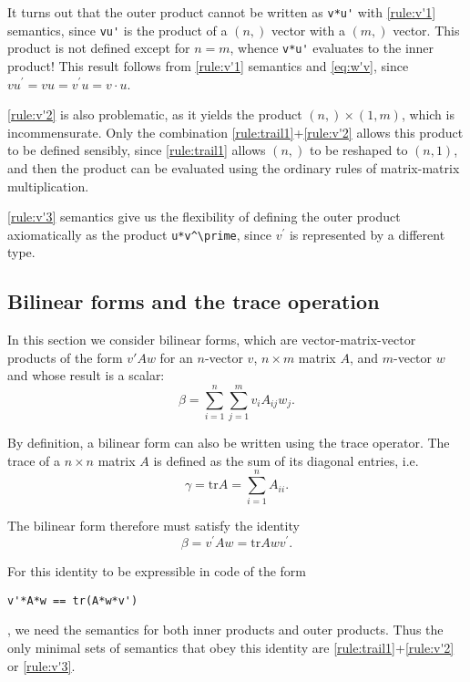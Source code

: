 It turns out that the outer product cannot be written as \lstinline|v*u'| with
\ref{rule:v'1} semantics, since \lstinline|vu'| is the product of a $(n,)$
vector with a $(m,)$ vector. This product is not defined except for $n = m$,
whence \lstinline|v*u'| evaluates to the inner product! This result follows
from \ref{rule:v'1} semantics and \eqref{eq:w'v}, since $vu^\prime = vu =
v^\prime u = v \cdot u$.

\ref{rule:v'2} is also problematic, as it yields the product $(n,) \times (1,
m)$, which is incommensurate. Only the combination
\ref{rule:trail1}+\ref{rule:v'2} allows this product to be defined sensibly,
since \ref{rule:trail1} allows $(n,)$ to be reshaped to $(n,1)$, and then the
product can be evaluated using the ordinary rules of matrix-matrix
multiplication.

\ref{rule:v'3} semantics give us the flexibility of defining the outer product
axiomatically as the product \lstinline|u*v^\prime|, since $v^\prime$ is represented
by a different type.



\subsection{Bilinear forms and the trace operation}

In this section we consider bilinear forms, which are vector-matrix-vector
products of the form $v'Aw$ for an $n$-vector $v$, $n\times m$ matrix $A$, and
$m$-vector $w$ and whose result is a scalar:
%
\begin{equation}
	\beta = \sum_{i=1}^n \sum_{j=1}^m v_i A_{ij} w_j.\label{eq:v'Aw}
\end{equation}

By definition, a bilinear form can also be written using the trace operator.
The trace of a $n \times n$ matrix $A$ is defined as the sum of its diagonal
entries, i.e.
%
\begin{equation}
	\gamma = \mathrm{tr }A = \sum_{i=1}^n A_{ii}.\label{eq:tr}
\end{equation}

The bilinear form therefore must satisfy the identity
%
\begin{equation}
	\beta = v^\prime Aw = \mathrm{tr }Awv^\prime.\label{eq:trid}
\end{equation}

For this identity to be expressible in code of the form
\begin{lstlisting}
v'*A*w == tr(A*w*v')
\end{lstlisting}
, we need the semantics for both inner products and outer products.
Thus the only minimal sets of semantics that obey this identity are
\ref{rule:trail1}+\ref{rule:v'2} or \ref{rule:v'3}.

